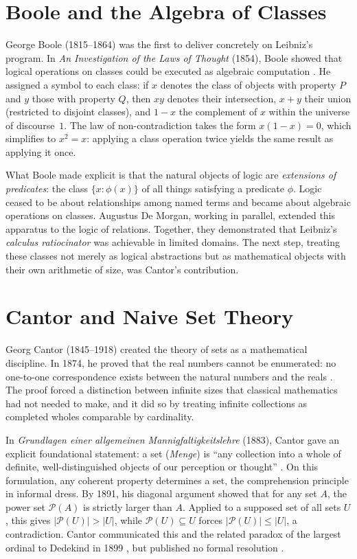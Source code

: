 \documentclass[12pt]{article}
\theoremstyle{definition}
\begin{document}
\section{Boole and the Algebra of Classes}

George Boole (1815--1864) was the first to deliver concretely on Leibniz's program. In \emph{An Investigation of the Laws of Thought} (1854), Boole showed that logical operations on classes could be executed as algebraic computation \cite{boole_laws}. He assigned a symbol to each class: if $x$ denotes the class of objects with property $P$ and $y$ those with property $Q$, then $xy$ denotes their intersection, $x + y$ their union (restricted to disjoint classes), and $1 - x$ the complement of $x$ within the universe of discourse~$1$. The law of non-contradiction takes the form $x(1-x) = 0$, which simplifies to $x^2 = x$: applying a class operation twice yields the same result as applying it once.

What Boole made explicit is that the natural objects of logic are \emph{extensions of predicates}: the class $\{x : \phi(x)\}$ of all things satisfying a predicate $\phi$. Logic ceased to be about relationships among named terms and became about algebraic operations on classes. Augustus De Morgan, working in parallel, extended this apparatus to the logic of relations. Together, they demonstrated that Leibniz's \emph{calculus ratiocinator} was achievable in limited domains. The next step, treating these classes not merely as logical abstractions but as mathematical objects with their own arithmetic of size, was Cantor's contribution.

\section{Cantor and Naive Set Theory}

Georg Cantor (1845--1918) created the theory of sets as a mathematical discipline. In 1874, he proved that the real numbers cannot be enumerated: no one-to-one correspondence exists between the natural numbers and the reals \cite{cantor_1874}. The proof forced a distinction between infinite sizes that classical mathematics had not needed to make, and it did so by treating infinite collections as completed wholes comparable by cardinality.

In \emph{Grundlagen einer allgemeinen Mannigfaltigkeitslehre} (1883), Cantor gave an explicit foundational statement: a set (\emph{Menge}) is ``any collection into a whole of definite, well-distinguished objects of our perception or thought'' \cite{cantor_grundlagen}. On this formulation, any coherent property determines a set, the comprehension principle in informal dress. By 1891, his diagonal argument showed that for any set $A$, the power set $\mathcal{P}(A)$ is strictly larger than $A$. Applied to a supposed set of all sets $U$, this gives $|\mathcal{P}(U)| > |U|$, while $\mathcal{P}(U) \subseteq U$ forces $|\mathcal{P}(U)| \leq |U|$, a contradiction. Cantor communicated this and the related paradox of the largest ordinal to Dedekind in 1899 \cite{cantor_letter_dedekind}, but published no formal resolution \cite{ferreiros_labyrinth}.
\end{document}

